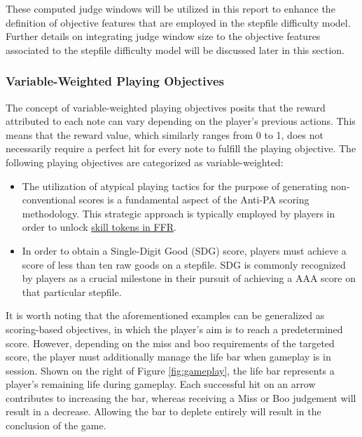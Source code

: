 \vspace{2mm}

These computed judge windows will be utilized in this report to enhance the definition of objective features that are employed in the stepfile difficulty model. Further details on integrating judge window size to the objective features associated to the stepfile difficulty model will be discussed later in this section.

\subsubsection{Variable-Weighted Playing Objectives}

The concept of variable-weighted playing objectives posits that the reward attributed to each note can vary depending on the player's previous actions. This means that the reward value, which similarly ranges from 0 to 1, does not necessarily require a perfect hit for every note to fulfill the playing objective. The following playing objectives are categorized as variable-weighted:

\begin{itemize}
    \item The utilization of atypical playing tactics for the purpose of generating non-conventional scores is a fundamental aspect of the Anti-PA scoring methodology. This strategic approach is typically employed by players in order to unlock \href{https://www.flashflashrevolution.com/tokens/skill_token_info.php}{skill tokens in FFR}.

    \item In order to obtain a Single-Digit Good (SDG) score, players must achieve a score of less than ten raw goods on a stepfile. SDG is commonly recognized by players as a crucial milestone in their pursuit of achieving a AAA score on that particular stepfile.
\end{itemize}



It is worth noting that the aforementioned examples can be generalized as scoring-based objectives, in which the player's aim is to reach a predetermined score. However, depending on the miss and boo requirements of the targeted score, the player must additionally manage the life bar when gameplay is in session. Shown on the right of Figure \ref{fig:gameplay}, the life bar represents a player's remaining life during gameplay. Each successful hit on an arrow contributes to increasing the bar, whereas receiving a Miss or Boo judgement will result in a decrease. Allowing the bar to deplete entirely will result in the conclusion of the game.

